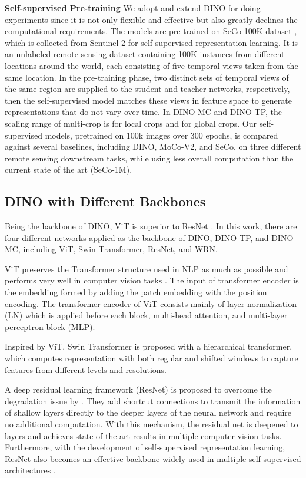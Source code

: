 \documentclass[10pt,twocolumn,letterpaper]{article}
\begin{document}
\textbf{Self-supervised Pre-training } 
We adopt and extend DINO for doing experiments since it is not only flexible and effective but also greatly declines the computational requirements.
The models are pre-trained on SeCo-100K dataset \cite{manas2021seasonal}, which is collected from Sentinel-2 \cite{drusch2012sentinel} for self-supervised representation learning.
It is an unlabeled remote sensing dataset containing 100K instances from different locations around the world, each consisting of five temporal views taken from the same location.
In the pre-training phase, two distinct sets of temporal views of the same region are supplied to the student and teacher networks, respectively, then the self-supervised model matches these views in feature space to generate representations that do not vary over time.
In DINO-MC and DINO-TP, the scaling range of multi-crop is  for local crops and  for global crops.
Our self-supervised models, pretrained on 100k images over 300 epochs, is compared against several baselines, including DINO, MoCo-V2, and SeCo, on three different remote sensing downstream tasks, while using less overall computation than the current state of the art (SeCo-1M).


\subsection{DINO with Different Backbones}
Being the backbone of DINO, ViT is superior to ResNet \cite{caron2021emerging}.
In this work, there are four different networks applied as the backbone of DINO, DINO-TP, and DINO-MC, including ViT, Swin Transformer, ResNet, and WRN.

ViT preserves the Transformer structure used in NLP as much as possible and performs very well in computer vision tasks \cite{dosovitskiy2020image}.
The input of transformer encoder is the embedding formed by adding the patch embedding with the position encoding.
The transformer encoder of ViT consists mainly of layer normalization (LN) which is applied before each block, multi-head attention, and multi-layer perceptron block (MLP).

Inspired by ViT, Swin Transformer is proposed with a hierarchical transformer, which computes representation with both regular and shifted windows to capture features from different levels and resolutions. 


A deep residual learning framework (ResNet) is proposed to overcome the degradation issue by \cite{he2016deep}.
They add shortcut connections to transmit the information of shallow layers directly to the deeper layers of the neural network and require no additional computation.
With this mechanism, the residual net is deepened to  layers and achieves state-of-the-art results in multiple computer vision tasks. 
Furthermore, with the development of self-supervised representation learning, ResNet also becomes an effective backbone widely used in multiple self-supervised architectures \cite{chen2020simple, grill2020bootstrap, oord2018representation, tian2020contrastive, misra2020self}. 
\end{document}
